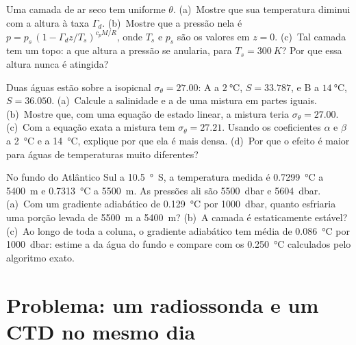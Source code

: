 \begin{exercise}[$\star\star\star$]\label{exo:b1:fluid-envelopes-structure:10}
Uma camada de ar seco tem  uniforme $\theta$. (a)~Mostre que sua temperatura
diminui com a altura à taxa $\Gamma_d$. (b)~Mostre que a pressão nela é $p = p_s\,(1 - \Gamma_d z/T_s)^{c_pM/R}$,
onde $T_s$ e $p_s$ são os valores em $z = 0$. (c)~Tal camada tem um topo: a que altura a pressão se
anularia, para $T_s = \qty{300}{K}$? Por que essa altura nunca é atingida?
\end{exercise}

\begin{exercise}[$\star\star\star$]\label{exo:b1:fluid-envelopes-structure:11}
Duas águas estão sobre a isopicnal $\sigma_\theta = 27.00$: A a $\qty{2}{\celsius}$,
$S = 33.787$, e B a $\qty{14}{\celsius}$, $S = 36.050$. (a)~Calcule a salinidade e a  de uma mistura em partes iguais. (b)~Mostre que, com uma equação de estado linear, a
mistura teria $\sigma_\theta = 27.00$. (c)~Com a equação exata a mistura tem $\sigma_\theta = 27.21$.
Usando os coeficientes $\alpha$ e $\beta$ a \qty{2}{\celsius} e a \qty{14}{\celsius}, explique por
que ela é mais densa. (d)~Por que o efeito é maior para águas de temperaturas muito diferentes?
\end{exercise}

\begin{exercise}[$\star\star\star$]\label{exo:b1:fluid-envelopes-structure:12}
No fundo do Atlântico Sul a \qty{10.5}{\degree S}, a temperatura medida é \qty{0.7299}{\celsius}
a \qty{5400}{m} e \qty{0.7313}{\celsius} a \qty{5500}{m}. As pressões ali são \qty{5500}{dbar} e
\qty{5604}{dbar}. (a)~Com um gradiente adiabático de \qty{0.129}{\celsius} por \qty{1000}{dbar},
quanto esfriaria uma porção levada de \qty{5500}{m} a \qty{5400}{m}? (b)~A camada é
estaticamente estável? (c)~Ao longo de toda a coluna, o gradiente adiabático tem média de
\qty{0.086}{\celsius} por \qty{1000}{dbar}: estime a  da água do fundo e
compare com os \qty{0.250}{\celsius} calculados pelo algoritmo exato.
\end{exercise}

\section{Problema: um radiossonda e um CTD no mesmo dia}

